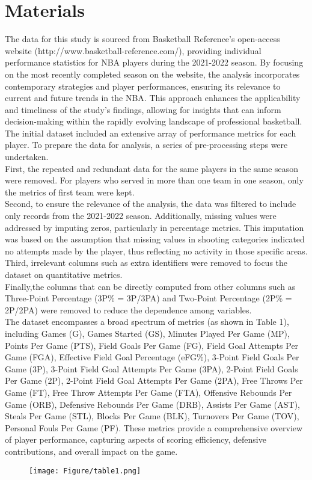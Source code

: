 \documentclass[fleqn,10pt]{SelfArx} %
\begin{document}
\section*{Materials}
The data for this study is sourced from Basketball Reference's open-access website (http://www.basketball-reference.com/), providing individual performance statistics for NBA players during the 2021-2022 season. By focusing on the most recently completed season on the website, the analysis incorporates contemporary strategies and player performances, ensuring its relevance to current and future trends in the NBA. This approach enhances the applicability and timeliness of the study's findings, allowing for insights that can inform decision-making within the rapidly evolving landscape of professional basketball.\\
The initial dataset included an extensive array of performance metrics for each player. To prepare the data for analysis, a series of pre-processing steps were undertaken.\\First, the repeated and redundant data for the same players in the same season were removed. For players who served in more than one team in one season, only the metrics of first team were kept.\\Second,
to ensure the relevance of the analysis, the data was filtered to include only records from the 2021-2022 season. Additionally, missing values were addressed by imputing zeros, particularly in percentage metrics. This imputation was based on the assumption that missing values in shooting categories indicated no attempts made by the player, thus reflecting no activity in those specific areas. \\Third, irrelevant columns such as extra identifiers were removed to focus the dataset on quantitative metrics. \\Finally,the columns that can be directly computed from other columns such as Three-Point Percentage (3P\% = 3P/3PA) and Two-Point Percentage (2P\% = 2P/2PA) were removed to reduce the dependence among variables.\\
The dataset encompasses a broad spectrum of metrics (as shown in Table 1), including Games (G), Games Started (GS), Minutes Played Per Game (MP), Points Per Game (PTS), Field Goals Per Game (FG), Field Goal Attempts Per Game (FGA), Effective Field Goal Percentage (eFG\%), 3-Point Field Goals Per Game (3P), 3-Point Field Goal Attempts Per Game (3PA), 2-Point Field Goals Per Game (2P), 2-Point Field Goal Attempts Per Game (2PA), Free Throws Per Game (FT), Free Throw Attempts Per Game (FTA), Offensive Rebounds Per Game (ORB), Defensive Rebounds Per Game (DRB), Assists Per Game (AST), Steals Per Game (STL), Blocks Per Game (BLK), Turnovers Per Game (TOV), Personal Fouls Per Game (PF). These metrics provide a comprehensive overview of player performance, capturing aspects of scoring efficiency, defensive contributions, and overall impact on the game. 
\begin{figure}[ht]
    \centering
    \texttt{[image: Figure/table1.png]}
\end{figure}
\end{document}
